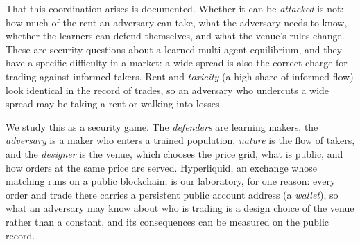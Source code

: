 \documentclass[11pt]{article}
\begin{document}
That this coordination arises is documented. Whether it can be \emph{attacked} is not: how much of the rent an adversary can take, what the adversary needs to know, whether the learners can defend themselves, and what the venue's rules change. These are security questions about a learned multi-agent equilibrium, and they have a specific difficulty in a market: a wide spread is also the correct charge for trading against informed takers. Rent and \emph{toxicity} (a high share of informed flow) look identical in the record of trades, so an adversary who undercuts a wide spread may be taking a rent or walking into losses.

We study this as a security game. The \emph{defenders} are learning makers, the \emph{adversary} is a maker who enters a trained population, \emph{nature} is the flow of takers, and the \emph{designer} is the venue, which chooses the price grid, what is public, and how orders at the same price are served. Hyperliquid, an exchange whose matching runs on a public blockchain, is our laboratory, for one reason: every order and trade there carries a persistent public account address (a \emph{wallet}), so what an adversary may know about who is trading is a design choice of the venue rather than a constant, and its consequences can be measured on the public record.
\end{document}
